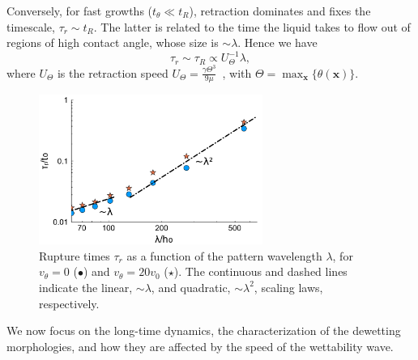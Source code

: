 Conversely, for fast growths ($t_{\theta} \ll t_R$), retraction dominates and fixes the timescale, $\tau_r \sim t_R$. 
The latter is related to the time the liquid takes to flow out of regions of high contact angle, whose size is $\sim \lambda$. 
Hence we have 
\begin{equation}\label{eq:taur_l1}
 \tau_r \sim \tau_R \propto U_{\Theta}^{-1}\lambda,
\end{equation}
where $U_{\Theta}$ is the retraction speed $U_{\Theta} = \frac{\gamma \Theta^3}{9\mu}$~\cite{edwardsNotSpreadingReverse2016}, with $\Theta = \max_{\mathbf{x}}\{\theta(\mathbf{x})\}$.
\begin{figure}
    \centering
    \includegraphics[width=0.65\textwidth]{graphics/Figure_2.pdf}
    \caption{Rupture times $\tau_r$ as a function of the pattern wavelength $\lambda$, for $v_{\theta}=0$ (\textcolor{jlblue}{$\bullet$}) and $v_{\theta}=20 v_0$ (\textcolor{jlorange}{$\star$}).
    The continuous and dashed lines indicate the linear, $\sim \lambda$, and quadratic, $\sim \lambda^2$, scaling laws, respectively.
        }
    \label{fig:model_rt}
\end{figure}
We now focus on the long-time dynamics, the characterization of the dewetting morphologies, and how they are affected by the speed of the wettability wave.
